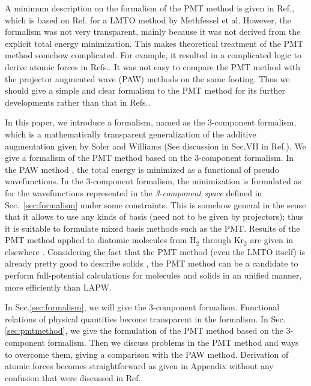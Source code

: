 \documentclass[twocolumn,showpacs,preprintnumbers,amsmath,amssymb,floatfix]{revtex4-1}
\newcommand{\refsec}[1]{\mbox{Sec.~\!\ref{#1}}}
\begin{document}
A minimum description on the formalism of the PMT method is given in Ref.\cite{pmt1}, 
which is based on Ref.\cite{lmfchap} for a LMTO method  
by Methfessel et al. However, the formalism was not very transparent, 
mainly because it was not derived from the explicit total energy minimization.
This makes theoretical treatment of the PMT method somehow complicated.
For example, it resulted in a complicated logic to derive atomic forces 
in Refs.\cite{molforce,lmfchap}. 
It was not easy to compare the PMT method with the projector augmented
wave (PAW) methods \cite{PAW,kresse99} on the same footing.
Thus we should give a simple and clear formalism to the PMT method 
for its further developments rather than that in Refs.\cite{pmt1,lmfchap}.

In this paper, we introduce a formalism, named as the 3-component
formalism, which is a mathematically transparent generalization of the additive
augmentation given by Soler and Williams \cite{soler89,soler90,soler93} 
(See discussion in Sec.VII in Ref.\cite{PAW}).
We give a formalism of the PMT method based on the 3-component formalism.
In the PAW method \cite{PAW}, the total energy is minimized as a
functional of pseudo wavefunctions. In the 3-component formalism,
the minimization is formulated as for the wavefunctions represented in the 
{\it 3-component space} defined in \refsec{sec:formalism} under some constraints.
This is somehow general in the sense that it allows to use any kinds of basis 
(need not to be given by projectors); thus it is
suitable to formulate mixed basis methods such as the PMT.
Results of the PMT method applied to diatomic molecules from H$_2$ through Kr$_2$ 
are given in elsewhere \cite{kotani_linearized_2013}. Considering the fact
that the PMT method (even the LMTO itself) is already pretty good to
describe solids \cite{pmt1,lmfchap,kotani07a,mark06adeq},
the PMT method can be a candidate to perform full-potential
calculations for molecules and solids in an unified manner, 
more efficiently than LAPW.

In Sec.\ref{sec:formalism}, we will give the 3-component formalism.
Functional relations of physical quantities become transparent in the formalism.
In Sec.\ref{sec:pmtmethod}, we give the formulation of the PMT method
based on the 3-component formalism. Then we discuss problems
in the PMT method and ways to overcome them, giving a comparison with the PAW method.
Derivation of atomic forces becomes straightforward as given in Appendix
without any confusion that were discussed in Ref.\cite{soler93}.
\end{document}
